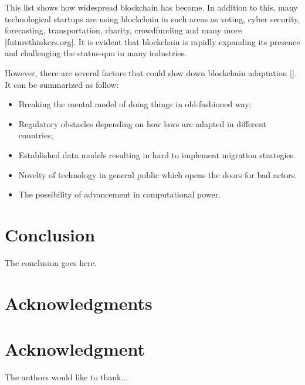\documentclass[conference,compsoc]{IEEEtran}
\begin{document}
This list shows how widespread blockchain has become. 
In addition to this, many technological startups are using blockchain in such areas as voting, cyber security, forecasting, transportation, charity, crowdfunding and many more [futurethinkers.org]. 
It is evident that blockchain is rapidly expanding its presence and challenging the status-quo in many industries. 

However, there are several factors that could slow down blockchain adaptation [].
It can be summarized as follow:
\begin{itemize}
    \item Breaking the mental model of doing things in old-fashioned way;
    \item Regulatory obstacles depending on how laws are adapted in different countries;
    \item Established data models resulting in hard to implement migration strategies.
    \item Novelty of technology in general public which opens the doors for bad actors.
    \item The possibility of advancement in computational power.
\end{itemize}

\section{Conclusion}
The conclusion goes here.







\ifCLASSOPTIONcompsoc
  \section*{Acknowledgments}
\else
  \section*{Acknowledgment}
\fi


The authors would like to thank...





\end{document}
